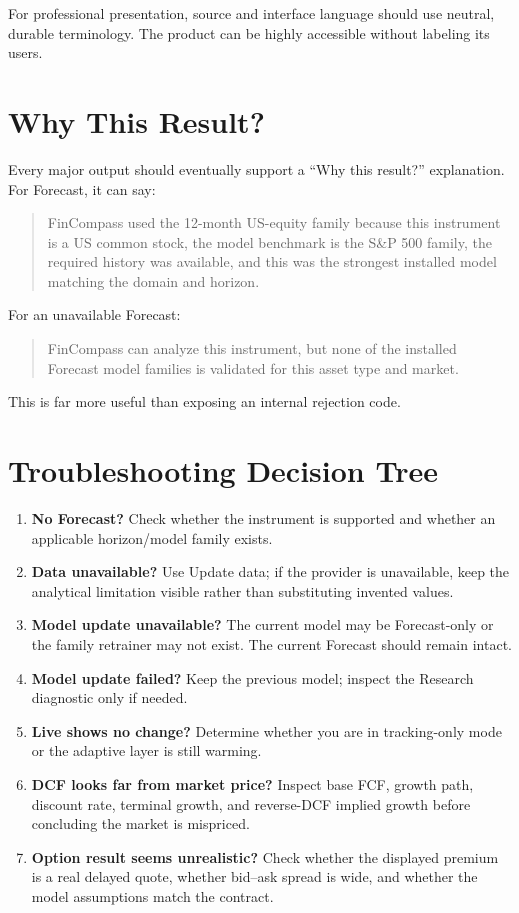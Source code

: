 \documentclass[11pt]{article}
\begin{document}
For professional presentation, source and interface language should use neutral, durable terminology. The product can be highly accessible without labeling its users.

\section{Why This Result?}
Every major output should eventually support a ``Why this result?'' explanation. For Forecast, it can say:
\begin{quote}
FinCompass used the 12-month US-equity family because this instrument is a US common stock, the model benchmark is the S\&P 500 family, the required history was available, and this was the strongest installed model matching the domain and horizon.
\end{quote}
For an unavailable Forecast:
\begin{quote}
FinCompass can analyze this instrument, but none of the installed Forecast model families is validated for this asset type and market.
\end{quote}
This is far more useful than exposing an internal rejection code.

\section{Troubleshooting Decision Tree}
\begin{enumerate}[itemsep=0.35em]
\item \textbf{No Forecast?} Check whether the instrument is supported and whether an applicable horizon/model family exists.
\item \textbf{Data unavailable?} Use Update data; if the provider is unavailable, keep the analytical limitation visible rather than substituting invented values.
\item \textbf{Model update unavailable?} The current model may be Forecast-only or the family retrainer may not exist. The current Forecast should remain intact.
\item \textbf{Model update failed?} Keep the previous model; inspect the Research diagnostic only if needed.
\item \textbf{Live shows no change?} Determine whether you are in tracking-only mode or the adaptive layer is still warming.
\item \textbf{DCF looks far from market price?} Inspect base FCF, growth path, discount rate, terminal growth, and reverse-DCF implied growth before concluding the market is mispriced.
\item \textbf{Option result seems unrealistic?} Check whether the displayed premium is a real delayed quote, whether bid--ask spread is wide, and whether the model assumptions match the contract.
\end{enumerate}
\end{document}
